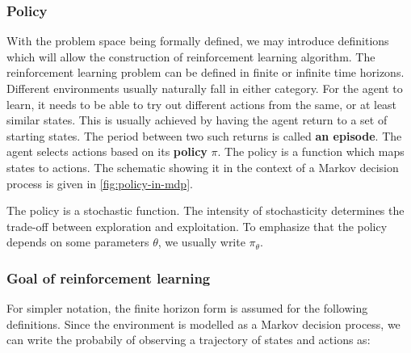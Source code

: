 \subsubsection{Policy}
With the problem space being formally defined,
we may introduce definitions which will allow the construction
of reinforcement learning algorithm.
The reinforcement learning problem can be defined in finite or infinite time horizons.
Different environments usually naturally fall in either category.
For the agent to learn, it needs to be able to try out different actions from the same, 
or at least similar states.
This is usually achieved by having the agent return to a set of starting states.
The period between two such returns is called \textbf{an episode}.
The agent selects actions based on its \textbf{policy} $ \pi  $.
The policy is a function which maps states to actions.
The schematic showing it in the context of a Markov decision process
is given in \ref{fig:policy-in-mdp}.
\begin{figure}[htpb]
\begin{center}
\end{center}
\end{figure}

The policy is a stochastic function. The intensity of stochasticity determines the trade-off
between exploration and exploitation.
To emphasize that the policy depends on some parameters $ \theta  $,
we usually write $ \pi_{ \theta } $.

\subsubsection{Goal of reinforcement learning}
For simpler notation, the finite horizon form
is assumed for the following definitions.
Since the environment is modelled as a Markov decision process,
we can write the probabily of observing a trajectory of states
and actions as:

